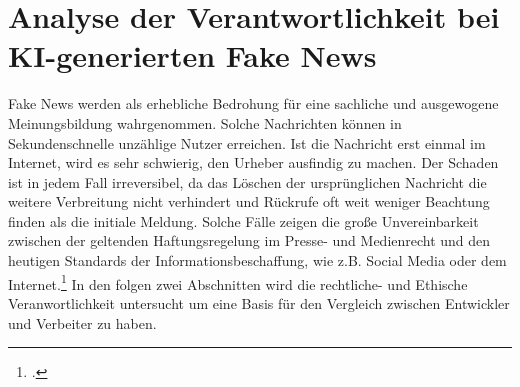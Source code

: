 \documentclass[Thesis.tex]{subfiles}
\begin{document}
\section{Analyse der Verantwortlichkeit bei KI-generierten Fake News}
Fake News werden als erhebliche Bedrohung für eine sachliche und ausgewogene Meinungsbildung wahrgenommen.
Solche Nachrichten können in Sekundenschnelle unzählige Nutzer erreichen.
 Ist die Nachricht erst einmal im Internet, wird es sehr schwierig, den Urheber ausfindig zu machen.
  Der Schaden ist in jedem Fall irreversibel, da das Löschen der ursprünglichen Nachricht die weitere Verbreitung
   nicht verhindert und Rückrufe oft weit weniger Beachtung finden als die initiale Meldung.
   Solche Fälle zeigen die große Unvereinbarkeit zwischen der geltenden Haftungsregelung im Presse- 
   und Medienrecht und den heutigen Standards der Informationsbeschaffung, wie z.B. Social Media oder 
   dem Internet.\footcite{DBWDUmgangmitFakenews} 
  In den folgen zwei Abschnitten wird die rechtliche- und Ethische Veranwortlichkeit untersucht um eine
  Basis für den Vergleich zwischen Entwickler und Verbeiter zu haben.
\end{document}
